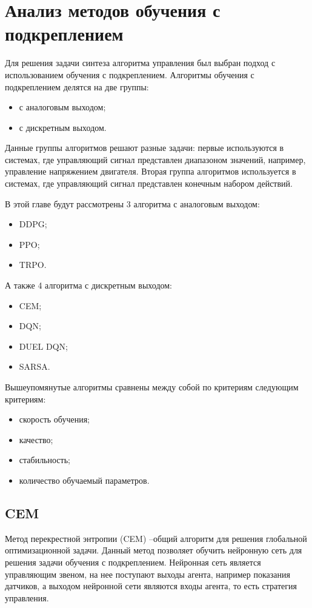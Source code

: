 \section{Анализ методов обучения с подкреплением}
Для решения задачи синтеза алгоритма управления был выбран подход с использованием обучения с подкреплением.
Алгоритмы обучения с подкреплением делятся на две группы:
\begin{itemize}
	\item с аналоговым выходом;
	\item с дискретным выходом.
\end{itemize}

Данные группы алгоритмов решают разные задачи: первые используются в системах, где управляющий сигнал представлен диапазоном значений, например, управление напряжением двигателя. 
Вторая группа алгоритмов используется в системах, где управляющий сигнал представлен конечным набором действий. 

В этой главе будут рассмотрены 3 алгоритма с аналоговым выходом:
\begin{itemize}
	\item DDPG;
	\item PPO;
	\item TRPO.
\end{itemize}

А также 4 алгоритма с дискретным выходом:
\begin{itemize}
	\item CEM;
	\item DQN;
	\item DUEL DQN;
	\item SARSA.
\end{itemize}

Вышеупомянутые алгоритмы сравнены между собой по критериям следующим критериям:
\begin{itemize}
	\item скорость обучения;
	\item качество;
	\item стабильность;
	\item количество обучаемый параметров.
\end{itemize}

\subsection{CEM}

Метод перекрестной энтропии (CEM) --общий алгоритм для решения глобальной оптимизационной задачи. 
Данный метод позволяет обучить нейронную сеть для решения задачи обучения с подкреплением. 
Нейронная сеть является управляющим звеном, на нее поступают выходы агента, например показания датчиков, а выходом нейронной сети являются входы агента, то есть стратегия управления.

